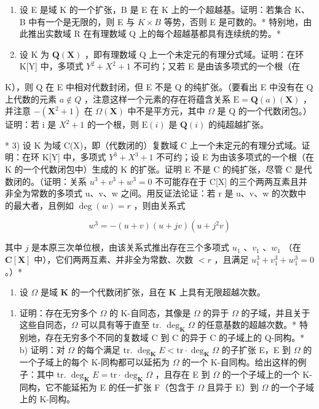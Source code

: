 \BourbakiExerciseGroup

\begin{enumerate}
\def\labelenumi{\arabic{enumi})}
\item
  设 E 是域 K 的一个扩张，B 是 E 在 K 上的一个超越基。证明：若集合 K、B 中有一个是无限的，则 E 与 \(K \times B\) 等势，否则 E 是可数的。* 特别地，由此推出实数域 R 在有理数域 Q 上的每个超越基都具有连续统的势。*
\item
  设 K 为 \(\mathbf{Q}(\mathbf{X})\) ，即有理数域 Q 上一个未定元的有理分式域。证明：在环 K{[}Y{]} 中，多项式 \(Y^{2} + X^{2} + 1\) 不可约；又若 E 是由该多项式的一个根（在
\end{enumerate}

K），则 Q 在 E 中相对代数封闭，但 E 不是 Q 的纯扩张。（要看出 E 中没有在 Q 上代数的元素 \(a \notin Q\) ，注意这样一个元素的存在将蕴含关系 \(\mathrm{E} = \mathbf{Q}(a)(\mathbf{X})\) ，并注意 \(-(\mathbf{X}^{2} + 1)\) 在 \(\Omega(\mathbf{X})\) 中不是平方元，其中 \(\Omega\) 是 Q 的一个代数闭包。）证明：若 i 是 \(X^{2} + 1\) 的一个根，则 \(\mathrm{E}(i)\) 是 \(\mathbf{Q}(i)\) 的纯超越扩张。

* 3) 设 K 为域 C(X)，即（代数闭的）复数域 C 上一个未定元的有理分式域。证明：在环 K{[}Y{]} 中，多项式 \(Y^{3} + X^{3} + 1\) 不可约；设 E 为由该多项式的一个根（在 K 的一个代数闭包中）生成的 K 的扩张。证明 E 不是 C 的纯扩张，尽管 C 是代数闭的。（证明：关系 \(u^{3} + v^{3} + w^{3} = 0\) 不可能存在于 C{[}X{]} 的三个两两互素且并非全为常数的多项式 u、v、w 之间。用反证法论证：若 r 是 u、v、w 的次数中的最大者，且例如 \(\deg(w) = r\) ，则由关系式

\[
w ^ {3} = - (u + v) (u + j v) (u + j ^ {2} v)
\]

其中 \(j\) 是本原三次单位根，由该关系式推出存在三个多项式 \(u_1\) 、\(v_1\) 、\(w_1\) （在 \(\mathbf{C}[\mathbf{X}]\) 中），它们两两互素、并非全为常数、次数 \(< r\) ，且满足 \(u_1^3 + v_1^3 + w_1^3 = 0\) 。）*

\begin{enumerate}
\def\labelenumi{\arabic{enumi})}
\setcounter{enumi}{3}
\tightlist
\item
  设 \(\Omega\) 是域 \(\mathbf{K}\) 的一个代数闭扩张，且在 \(\mathbf{K}\) 上具有无限超越次数。
\end{enumerate}

\begin{enumerate}
\def\labelenumi{\alph{enumi})}
\tightlist
\item
  证明：存在无穷多个 \(\Omega\) 的 K-自同态，其像是 \(\Omega\) 的异于 \(\Omega\) 的子域，并且关于这些自同态，\(\Omega\) 可以具有等于直至 tr. \(\deg_{\mathbf{K}}\Omega\) 的任意基数的超越次数。* 特别地，存在无穷多个不同的复数域 C 到 C 的异于 C 的子域上的 Q-同构。* b) 证明：对 \(\Omega\) 的每个满足 tr. \(\deg_{\mathbf{K}}E < \text{tr} \cdot \deg_{\mathbf{K}}\Omega\) 的子扩张 E，E 到 \(\Omega\) 的一个子域上的每个 K-同构都可以延拓为 \(\Omega\) 的一个 K-自同构。给出这样的例子：其中 tr. \(\deg_{\mathbf{K}}E = \text{tr} \cdot \deg_{\mathbf{K}}\Omega\) ，且存在 E 到 \(\Omega\) 的一个子域上的一个 K-同构，它不能延拓为 E 的任一扩张 F（包含于 \(\Omega\) 且异于 E）到 \(\Omega\) 的一个子域上的 K-同构。
\end{enumerate}


